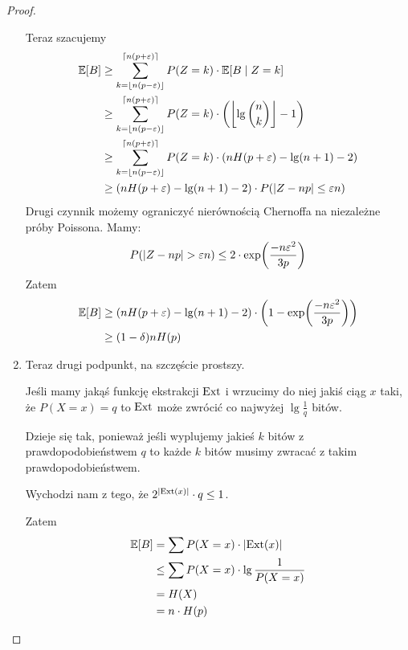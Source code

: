 \begin{proof}
\begin{enumerate}
    Teraz szacujemy
    \begin{align*}
        \expected{B} 
            &\geq \sum_{k=\floor{n(p-\varepsilon)}}^{\ceil{n(p+\varepsilon)}} P(Z = k) \cdot \expected{B \mid Z = k} \\
            &\geq  \sum_{k=\floor{n(p-\varepsilon)}}^{\ceil{n(p+\varepsilon)}} P(Z = k) \cdot \pars{\floor{\lg \binom{n}{k}} - 1} \\
            &\geq \sum_{k=\floor{n(p-\varepsilon)}}^{\ceil{n(p+\varepsilon)}} P(Z = k) \cdot \pars{nH(p+\varepsilon) - \lg (n+1) - 2} \\
            &\geq \pars{nH(p+\varepsilon) - \lg (n+1) - 2} \cdot P\pars{\abs{Z - np} \leq \varepsilon n}
    \end{align*}
    Drugi czynnik możemy ograniczyć nierównością Chernoffa na niezależne próby Poissona. Mamy:
    \[
        P\pars{\abs{Z - np} > \varepsilon n} \leq 2\cdot \exp\pars{\frac{-n\varepsilon^2}{3p}}
    \]
    Zatem
    \begin{align*}
        \expected{B} 
            &\geq \pars{nH(p+\varepsilon) - \lg (n+1) - 2} 
                \cdot \pars{1 -\exp\pars{\frac{-n\varepsilon^2}{3p}}} \\
            &\geq (1 - \delta)n H(p)
    \end{align*}
    
    \item Teraz drugi podpunkt, na szczęście prostszy.
    
    Jeśli mamy jakąś funkcję ekstrakcji \( \operatorname{Ext} \) i wrzucimy do niej jakiś ciąg \( x \) taki, że 
    \( P(X = x) = q \) to \( \operatorname{Ext} \) może zwrócić co najwyżej \( \lg \frac{1}{q} \) bitów.
    
    Dzieje się tak, ponieważ jeśli wyplujemy jakieś \( k \) bitów z prawdopodobieństwem \( q \) to każde \( k \) bitów musimy zwracać z takim prawdopodobieństwem.
    
    Wychodzi nam z tego, że \( 2^{\left\lvert\operatorname{Ext}(x)\right\rvert} \cdot q \leq 1 \).
    
    Zatem
    \begin{align*}
        \expected{B} 
            &= \sum P(X = x) \cdot \abs{\Ext(x)} \\
            &\leq \sum P(X = x) \cdot \lg \frac{1}{P(X = x)} \\
            &= H(X) \\
            &= n \cdot H(p)
    \end{align*}
\end{enumerate}
\end{proof}